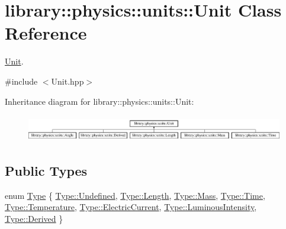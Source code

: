 \hypertarget{classlibrary_1_1physics_1_1units_1_1_unit}{}\section{library\+:\+:physics\+:\+:units\+:\+:Unit Class Reference}
\label{classlibrary_1_1physics_1_1units_1_1_unit}


\hyperlink{classlibrary_1_1physics_1_1units_1_1_unit}{Unit}.  




{\ttfamily \#include $<$Unit.\+hpp$>$}

Inheritance diagram for library\+:\+:physics\+:\+:units\+:\+:Unit\+:\begin{figure}[H]
\begin{center}
\leavevmode
\includegraphics[height=1.185185cm]{classlibrary_1_1physics_1_1units_1_1_unit}
\end{center}
\end{figure}
\subsection*{Public Types}
\begin{DoxyCompactItemize}
\item 
enum \hyperlink{classlibrary_1_1physics_1_1units_1_1_unit_a828bc1b6ad6fa5cbef904ea0fede986a}{Type} \{ \newline
\hyperlink{classlibrary_1_1physics_1_1units_1_1_unit_a828bc1b6ad6fa5cbef904ea0fede986aaec0fc0100c4fc1ce4eea230c3dc10360}{Type\+::\+Undefined}, 
\hyperlink{classlibrary_1_1physics_1_1units_1_1_unit_a828bc1b6ad6fa5cbef904ea0fede986aaba2a9c6c8c77e03f83ef8bf543612275}{Type\+::\+Length}, 
\hyperlink{classlibrary_1_1physics_1_1units_1_1_unit_a828bc1b6ad6fa5cbef904ea0fede986aaff2864d6f652ee0ac254814f1ae4f4a8}{Type\+::\+Mass}, 
\hyperlink{classlibrary_1_1physics_1_1units_1_1_unit_a828bc1b6ad6fa5cbef904ea0fede986aaa76d4ef5f3f6a672bbfab2865563e530}{Type\+::\+Time}, 
\newline
\hyperlink{classlibrary_1_1physics_1_1units_1_1_unit_a828bc1b6ad6fa5cbef904ea0fede986aaee7a8e262285ed49ea1b4e4ae11525bd}{Type\+::\+Temperature}, 
\hyperlink{classlibrary_1_1physics_1_1units_1_1_unit_a828bc1b6ad6fa5cbef904ea0fede986aa9a60fd92ac6161bffa549ef2cd17f05e}{Type\+::\+Electric\+Current}, 
\hyperlink{classlibrary_1_1physics_1_1units_1_1_unit_a828bc1b6ad6fa5cbef904ea0fede986aae91a9eb4f5dcc51ea18e180ea981d6ae}{Type\+::\+Luminous\+Intensity}, 
\hyperlink{classlibrary_1_1physics_1_1units_1_1_unit_a828bc1b6ad6fa5cbef904ea0fede986aa0e77a10e9579997fa646fbda4118e108}{Type\+::\+Derived}
 \}
\end{DoxyCompactItemize}
